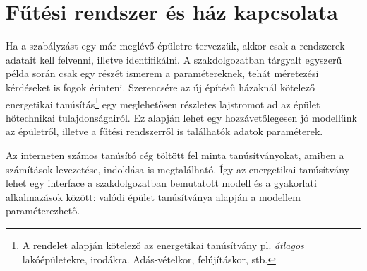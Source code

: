 %
%
%



\section{Fűtési rendszer és ház kapcsolata}

\begin{formal}
	Ha a szabályzást egy már meglévő épületre tervezzük, akkor csak a rendszerek adatait kell felvenni, illetve identifikálni. A szakdolgozatban tárgyalt egyszerű példa során csak egy részét ismerem a paramétereknek, tehát méretezési kérdéseket is fogok érinteni.  Szerencsére az új építésű házaknál kötelező energetikai tanúsítás\footnote{A rendelet \cite{TNM2006} alapján kötelező az energetikai tanúsítvány pl. \textit{átlagos} lakóépületekre, irodákra. Adás-vételkor, felújításkor, stb.} egy meglehetősen részletes lajstromot ad az épület hőtechnikai tulajdonságairól. Ez alapján lehet egy hozzávetőlegesen jó modellünk az épületről, illetve a fűtési rendszerről is találhatók adatok paraméterek.

\end{formal}



 Az interneten számos tanúsító cég töltött fel minta tanúsítványokat, amiben a számítások levezetése, indoklása is megtalálható. Így az energetikai tanúsítvány lehet egy interface a szakdolgozatban bemutatott modell és a gyakorlati alkalmazások között: valódi épület tanúsítványa alapján a modellem paraméterezhető.


